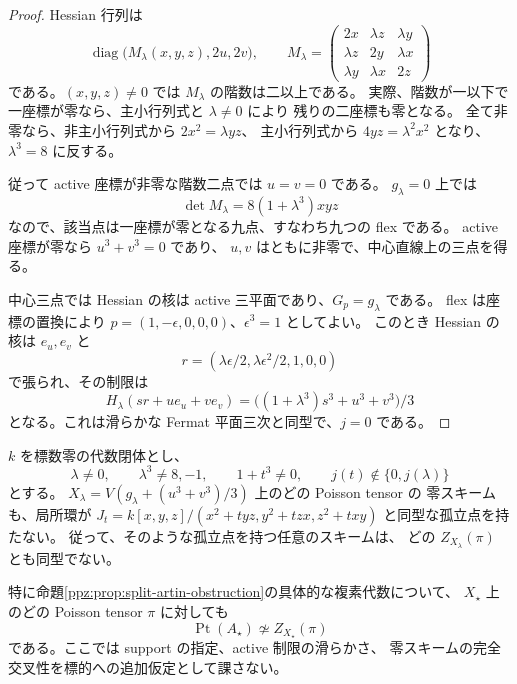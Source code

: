 \begin{proof}
Hessian 行列は
\[
 \operatorname{diag}\bigl(M_\lambda(x,y,z),2u,2v\bigr),\qquad
 M_\lambda=\begin{pmatrix}
 2x&\lambda z&\lambda y\\
 \lambda z&2y&\lambda x\\
 \lambda y&\lambda x&2z
 \end{pmatrix}
\]
である。$(x,y,z)\ne0$ では $M_\lambda$ の階数は二以上である。
実際、階数が一以下で一座標が零なら、主小行列式と $\lambda\ne0$ により
残りの二座標も零となる。
全て非零なら、非主小行列式から $2x^2=\lambda yz$、
主小行列式から $4yz=\lambda^2x^2$ となり、$\lambda^3=8$ に反する。

従って active 座標が非零な階数二点では $u=v=0$ である。
$g_\lambda=0$ 上では
\[
 \det M_\lambda=8(1+\lambda^3)xyz
\]
なので、該当点は一座標が零となる九点、すなわち九つの flex である。
active 座標が零なら $u^3+v^3=0$ であり、
$u,v$ はともに非零で、中心直線上の三点を得る。

中心三点では Hessian の核は active 三平面であり、$G_p=g_\lambda$ である。
flex は座標の置換により
$p=(1,-\epsilon,0,0,0)$、$\epsilon^3=1$ としてよい。
このとき Hessian の核は $e_u,e_v$ と
\[
 r=(\lambda\epsilon/2,\lambda\epsilon^2/2,1,0,0)
\]
で張られ、その制限は
\[
 H_\lambda(sr+u e_u+v e_v)
 =\bigl((1+\lambda^3)s^3+u^3+v^3\bigr)/3
\]
となる。これは滑らかな Fermat 平面三次と同型で、$j=0$ である。
\end{proof}

\begin{theorem}
\label{ppz:thm:all-poisson-obstruction}
$k$ を標数零の代数閉体とし、
\[
 \lambda\ne0,\qquad \lambda^3\ne8,-1,\qquad
 1+t^3\ne0,\qquad j(t)\notin\{0,j(\lambda)\}
\]
とする。
$X_\lambda=V(g_\lambda+(u^3+v^3)/3)$ 上のどの Poisson tensor の
零スキームも、局所環が
$J_t=k[x,y,z]/(x^2+tyz,y^2+tzx,z^2+txy)$ と同型な孤立点を持たない。
従って、そのような孤立点を持つ任意のスキームは、
どの $Z_{X_\lambda}(\pi)$ とも同型でない。

特に命題\ref{ppz:prop:split-artin-obstruction}の具体的な複素代数について、
$X_\star$ 上のどの Poisson tensor $\pi$ に対しても
\[
 \operatorname{Pt}(A_\star)\not\simeq Z_{X_\star}(\pi)
\]
である。ここでは support の指定、active 制限の滑らかさ、
零スキームの完全交叉性を標的への追加仮定として課さない。
\end{theorem}

